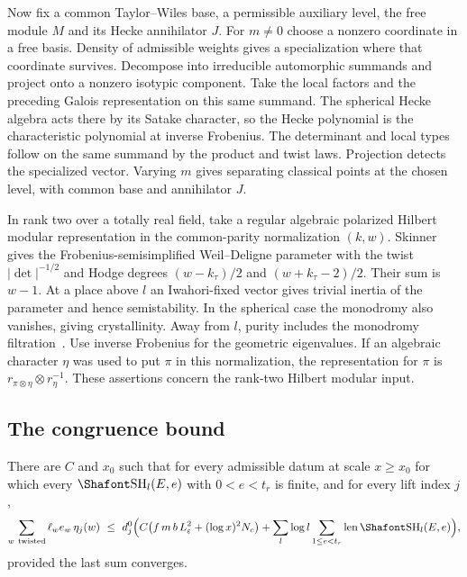 Now fix a common Taylor--Wiles base, a permissible auxiliary level, the free module $M$ and its Hecke annihilator $J$. For $m\ne0$ choose a nonzero coordinate in a free basis. Density of admissible weights gives a specialization where that coordinate survives. Decompose into irreducible automorphic summands and project onto a nonzero isotypic component. Take the local factors and the preceding Galois representation on this same summand. The spherical Hecke algebra acts there by its Satake character, so the Hecke polynomial is the characteristic polynomial at inverse Frobenius. The determinant and local types follow on the same summand by the product and twist laws. Projection detects the specialized vector. Varying $m$ gives separating classical points at the chosen level, with common base and annihilator $J$.

In rank two over a totally real field, take a regular algebraic polarized
Hilbert modular representation in the common-parity normalization $(k,w)$.
Skinner~\cite[eq.~(1), Thm.~1]{skinner09} gives the Frobenius-semisimplified
Weil--Deligne parameter with the twist $|\det|^{-1/2}$ and Hodge degrees
$(w-k_\tau)/2$ and $(w+k_\tau-2)/2$. Their sum is $w-1$.
At a place above $l$ an Iwahori-fixed vector gives trivial inertia of the
parameter and hence semistability. In the spherical case the monodromy
also vanishes, giving crystallinity. Away from $l$, purity includes the
monodromy filtration~\cite[Cor.~7]{blasius}. Use inverse Frobenius for the
geometric eigenvalues. If an algebraic character $\eta$ was used to put
$\pi$ in this normalization, the representation for $\pi$ is
$r_{\pi\otimes\eta}\otimes r_\eta^{-1}$. These assertions concern the
rank-two Hilbert modular input.




\subsection{The congruence bound}\label{tw:sec:linkn}

\begin{hypothesis}\label{w4:thm:linkn}
There are $C$ and $x_0$ such that for every admissible datum at scale $x\ge x_0$ for which every $\Sha_l(E,e)$ with $0<e<t_r$ is finite, and for every lift index $j$,
\[
\sum_{w\ \mathrm{twisted}}\ell_we_w\,\eta_j(w)\ \le\ d^0_j\Bigl(C\bigl(f\,m\,b\,L_\varepsilon^2+(\log x)^2N_c\bigr)+\sum_l\log l\sum_{1\le e<t_r}\len\Sha_l(E,e)\Bigr),
\]
provided the last sum converges.
\end{hypothesis}

